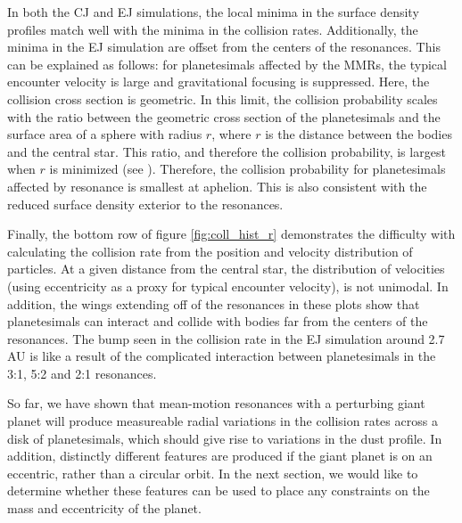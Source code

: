 \documentclass[onecolumn]{aastex63}
\begin{document}
In both the CJ and EJ simulations, the local minima in the surface density profiles match well with the minima in the collision rates. 
Additionally, the minima in the EJ simulation are offset from the centers of the resonances. This can be explained as follows: for 
planetesimals affected by the MMRs, the typical encounter velocity is large and gravitational focusing is suppressed. Here, the collision 
cross section is geometric. In this limit, the collision probability scales with the ratio between the geometric cross section of the 
planetesimals and the surface area of a sphere with radius $r$, where $r$ is the distance between the bodies and the central star. This 
ratio, and therefore the collision probability, is largest when $r$ is minimized (see \citet{2003AJ....125.2692L}). Therefore, the collision 
probability for planetesimals affected by resonance is smallest at aphelion. This is also consistent with the reduced surface density exterior 
to the resonances.

Finally, the bottom row of figure \ref{fig:coll_hist_r} demonstrates the difficulty with calculating the collision rate from the position and velocity 
distribution of particles. At a given distance from the central star, the distribution of velocities (using eccentricity as a proxy for typical encounter 
velocity), is not unimodal. In addition, the wings extending off of the resonances in these plots show that planetesimals can interact and collide 
with bodies far from the centers of the resonances. The bump seen in the collision rate in the EJ simulation around 2.7 AU is like a result of the 
complicated interaction between planetesimals in the 3:1, 5:2 and 2:1 resonances.

So far, we have shown that mean-motion resonances with a perturbing giant planet will produce measureable radial variations in the collision rates across a disk of planetesimals, which should give rise to variations in the dust profile. In addition, distinctly different features are produced if the giant planet is on an eccentric, rather than a circular orbit. In the next section, we would like to determine whether these features can be used to place any constraints on the mass and eccentricity of the planet.
\end{document}
